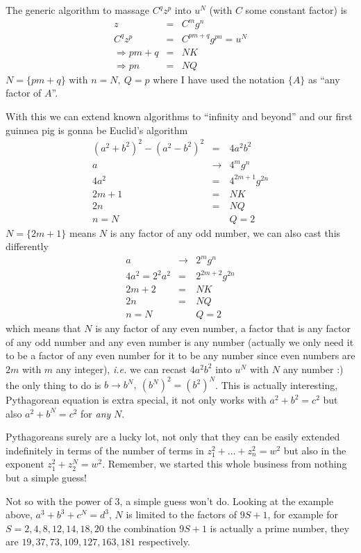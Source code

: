 \documentclass[aps,preprint,preprintnumbers,nofootinbib,showpacs,prd]{revtex4-1}
\newcommand{\ie}{{\it i.e.} }
\newcommand{\nbea}{\begin{eqnarray*}}
\newcommand{\neea}{\end{eqnarray*}}
\begin{document}
The generic algorithm to massage $C^q z^p$ into $u^N$ (with $C$ some constant factor) is
%
\nbea
z & = & C^m g^n \\
C^q z^p & = & C^{pm+q} g^{pn} = u^N \\
\Rightarrow pm + q & = & NK \\
\Rightarrow pn & = & NQ
\neea
%
$N=\{pm + q\}$ with $n = N, ~ Q=p$ where I have used the notation $\{A\}$ as ``any factor of $A$''.

With this we can extend known algorithms to ``infinity and beyond'' and our first guinnea pig is gonna be Euclid's algorithm
%
\nbea
(a^2 + b^2)^2 - (a^2 - b^2)^2 & = & 4 a^2 b^2 \\
a & \rightarrow & 4^m g^n \\
4a^2 & = & 4^{2m+1} g^{2n} \\
2m+1 & = & NK \\
2n & = & NQ \\
n = N & ~~~ & Q = 2
\neea
%
$N = \{2m+1\}$ means $N$ is any factor of any odd number, we can also cast this differently
%
\nbea
a & \rightarrow & 2^m g^n \\
4a^2=2^2a^2 & = & 2^{2m+2} g^{2n} \\
2m+2 & = & NK \\
2n & = & NQ \\
n = N & ~~~ & Q = 2
\neea
%
which means that $N$ is any factor of any even number, a factor that is any factor of any odd number and any even number is any number (actually we only need it to be a factor of any even number for it to be any number since even numbers are $2m$ with $m$ any integer), \ie we can recast $4a^2b^2$ into $u^N$ with $N$ any number :) the only thing to do is $b \rightarrow b^{N}, ~ (b^N)^2 = (b^2)^N$. This is actually interesting, Pythagorean equation is extra special, it not only works with $a^2 + b^2 = c^2$ but also $a^2 + b^N = c^2$ for {\it any} $N$.

Pythagoreans surely are a lucky lot, not only that they can be easily extended indefinitely in terms of the number of terms in $z_1^2 + \dots + z_n^2 = w^2$ but also in the exponent $z_1^2 + z_2^N = w^2$. Remember, we started this whole business from nothing but a simple guess!

Not so with the power of 3, a simple guess won't do. Looking at the example above, $a^3 + b^3 + c^N = d^3$, $N$ is limited to the factors of $9S+1$, for example for $S=2,4,8,12,14,18,20$ the combination $9S+1$ is actually a prime number, they are $19, 37, 73, 109, 127, 163, 181$ respectively.
\end{document}
